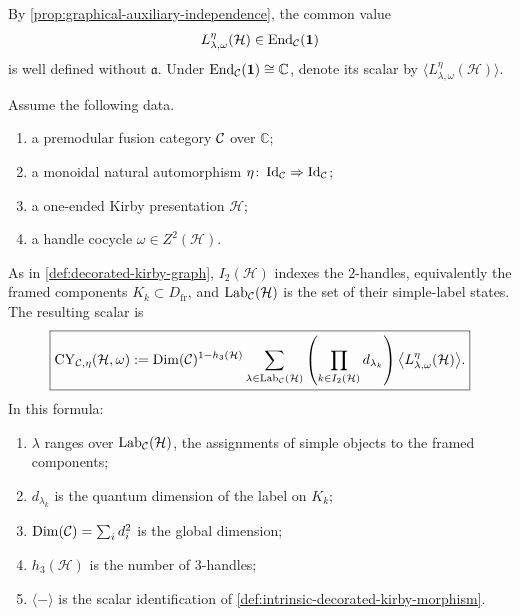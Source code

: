 \begin{definition}
\label{def:intrinsic-decorated-kirby-morphism}
By \cref{prop:graphical-auxiliary-independence}, the common value
\[
  L^\eta_{\lambda,\omega}(\mathcal H)
  \in\operatorname{End}_{\mathcal{C}}(\mathbf1)
\]
is well defined without \(\mathfrak a\).  Under
\(\operatorname{End}_{\mathcal{C}}(\mathbf1)\cong\mathbb C\), denote its scalar by
\(\langle L^\eta_{\lambda,\omega}(\mathcal H)\rangle\).
\end{definition}

\begin{definition}
\label{def:twisted-handle-evaluator}
Assume the following data.
\begin{enumerate}[label=\textup{(\roman*)}]
\item a premodular fusion category \(\mathcal{C}\) over \(\mathbb C\);
\item a monoidal natural automorphism
  \(\eta\colon\operatorname{Id}_{\mathcal{C}}\Rightarrow
  \operatorname{Id}_{\mathcal{C}}\);
\item a one-ended Kirby presentation \(\mathcal H\);
\item a handle cocycle \(\omega\in Z^2(\mathcal H)\).
\end{enumerate}
As in \cref{def:decorated-kirby-graph}, \(I_2(\mathcal H)\) indexes the
\(2\)-handles, equivalently the framed components \(K_k\subset
D_{\mathrm{fr}}\), and
\(\operatorname{Lab}_{\mathcal{C}}(\mathcal H)\) is the set of their simple-label
states.
The resulting scalar is
\begin{equation}
  \boxed{
  \operatorname{CY}_{\mathcal{C},\eta}(\mathcal H,\omega)
  :=
  \operatorname{Dim}(\mathcal{C})^{1-h_3(\mathcal H)}
  \sum_{\lambda\in\operatorname{Lab}_{\mathcal{C}}(\mathcal H)}
    \left(\prod_{k\in I_2(\mathcal H)} d_{\lambda_k}\right)
      \bigl\langle L^\eta_{\lambda,\omega}(\mathcal H)\bigr\rangle.}
  \label{eq:twisted-handle-evaluator}
\end{equation}
In this formula:
\begin{enumerate}[label=\textup{(\roman*)}]
\item \(\lambda\) ranges over
  \(\operatorname{Lab}_{\mathcal{C}}(\mathcal H)\), the assignments of simple
  objects to the framed components;
\item \(d_{\lambda_k}\) is the quantum dimension of the label on \(K_k\);
\item \(\operatorname{Dim}(\mathcal{C})=\sum_i d_i^2\) is the global dimension;
\item \(h_3(\mathcal H)\) is the number of \(3\)-handles;
\item \(\langle-\rangle\) is the scalar identification of
  \cref{def:intrinsic-decorated-kirby-morphism}.
\end{enumerate}
\end{definition}

